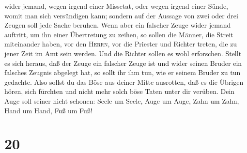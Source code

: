 wider jemand, wegen irgend einer Missetat, oder wegen irgend einer
Sünde, womit man sich versündigen kann; sondern auf der Aussage von zwei
oder drei Zeugen soll jede Sache beruhen.  Wenn aber ein
falscher Zeuge wider jemand auftritt, um ihn einer Übertretung zu
zeihen,  so sollen die Männer, die Streit miteinander
haben, vor den \textsc{Herrn}, vor die Priester und Richter treten, die
zu jener Zeit im Amt sein werden.  Und die Richter sollen
es wohl erforschen. Stellt es sich heraus, daß der Zeuge ein falscher
Zeuge ist und wider seinen Bruder ein falsches Zeugnis abgelegt hat,
 so sollt ihr ihm tun, wie er seinem Bruder zu tun
gedachte. Also sollst du das Böse aus deiner Mitte ausrotten,
 daß es die Übrigen hören, sich fürchten und nicht mehr
solch böse Taten unter dir verüben.  Dein Auge soll
seiner nicht schonen: Seele um Seele, Auge um Auge, Zahn um Zahn, Hand
um Hand, Fuß um Fuß!

\hypertarget{section-19}{%
\section{20}\label{section-19}}

